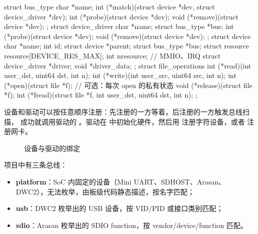 \begin{ccode}
struct bus_type {
  char *name;
  int  (*match)(struct device *dev, struct device_driver *drv);
  int  (*probe)(struct device *dev);
  void (*remove)(struct device *dev);
};
struct device_driver {
  char *name;  struct bus_type *bus;
  int  (*probe)(struct device *dev);
  void (*remove)(struct device *dev);
};
struct device {
  char *name;  int id;  struct device *parent;  struct bus_type *bus;
  struct resource resource[DEVICE_RES_MAX];  int nresource;  // MMIO、IRQ
  struct device_driver *driver;  void *driver_data;
};
struct file_operations {
  int  (*read)(int user_dst, uint64 dst, int n);
  int  (*write)(int user_src, uint64 src, int n);
  int  (*open)(struct file *f);                 // 可选：每次 open 的私有状态
  void (*release)(struct file *f);
  int  (*fread)(struct file *f, int user_dst, uint64 dst, int n);
};
\end{ccode}

设备和驱动可以按任意顺序注册：先注册的一方等着，后注册的一方触发总线扫描， 成功就调用驱动的 。驱动在  中初始化硬件，然后用  注册字符设备，或者  注册网卡。

\begin{figure}[htbp]
  \centering
  \caption{设备与驱动的绑定}
  \label{fig:devmodel}
\end{figure}

项目中有三条总线：

\begin{itemize}
  \item \textbf{platform}：SoC 内固定的设备（Mini UART、SDHOST、Arasan、DWC2），无法枚举，由板级代码静态描述，按名字匹配；
  \item \textbf{usb}：DWC2 枚举出的 USB 设备，按 VID/PID 或接口类别匹配；
  \item \textbf{sdio}：Arasan 枚举出的 SDIO function，按 vendor/device/function 匹配。
\end{itemize}


